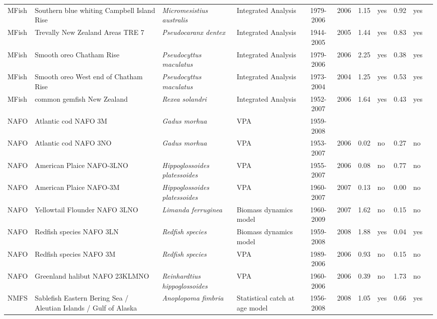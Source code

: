 \begin{longtable}{p{1.8cm}p{3.5cm}p{3.5cm}p{3cm}cccp{0.9cm}cp{0.9cm}c}
  MFish & Southern blue whiting Campbell Island Rise & \textit{Micromesistius australis} & Integrated Analysis & 1979-2006 & 2006 & 1.15 & yes & 0.92 & yes & \cite{NA} \\ 
  MFish & Trevally New Zealand Areas TRE 7 & \textit{Pseudocaranx dentex} & Integrated Analysis & 1944-2005 & 2005 & 1.44 & yes & 0.83 & yes & \cite{NA} \\ 
  MFish & Smooth oreo Chatham Rise & \textit{Pseudocyttus maculatus} & Integrated Analysis & 1979-2006 & 2006 & 2.25 & yes & 0.38 & yes & \cite{NA} \\ 
  MFish & Smooth oreo West end of Chatham Rise & \textit{Pseudocyttus maculatus} & Integrated Analysis & 1973-2004 & 2004 & 1.25 & yes & 0.53 & yes & \cite{NA} \\ 
  MFish & common gemfish New Zealand & \textit{Rexea solandri} & Integrated Analysis & 1952-2007 & 2006 & 1.64 & yes & 0.43 & yes & \cite{NA} \\ 
  NAFO & Atlantic cod NAFO 3M & \textit{Gadus morhua} & VPA & 1959-2008 &  &  &  &  &  & \cite{NAFO-3M-COD-2008.pdf} \\ 
  NAFO & Atlantic cod NAFO 3NO & \textit{Gadus morhua} & VPA & 1953-2007 & 2006 & 0.02 & no & 0.27 & no & \cite{NAFO-3NO-COD-2007.pdf} \\ 
  NAFO & American Plaice NAFO-3LNO & \textit{Hippoglossoides platessoides} & VPA & 1955-2007 & 2006 & 0.08 & no & 0.77 & no & \cite{NAFO-GrandBanks-AmPlaice-2007.pdf} \\ 
  NAFO & American Plaice NAFO-3M & \textit{Hippoglossoides platessoides} & VPA & 1960-2007 & 2007 & 0.13 & no & 0.00 & no & \cite{NAFO-AMPL3M-2008.pdf} \\ 
  NAFO & Yellowtail Flounder NAFO 3LNO & \textit{Limanda ferruginea} & Biomass dynamics model & 1960-2009 & 2007 & 1.62 & no & 0.15 & no & \cite{NAFO-YELL3LNO-2008.pdf} \\ 
  NAFO & Redfish species NAFO 3LN & \textit{Redfish species} & Biomass dynamics model & 1959-2008 & 2008 & 1.88 & yes & 0.04 & yes & \cite{NAFO-3LN-Redfishspp-2008.pdf} \\ 
  NAFO & Redfish species NAFO 3M & \textit{Redfish species} & VPA & 1989-2006 & 2006 & 0.93 & no & 0.15 & no & \cite{NAFO-RED3M-2007.pdf} \\ 
  NAFO & Greenland halibut NAFO 23KLMNO & \textit{Reinhardtius hippoglossoides} & VPA & 1960-2006 & 2006 & 0.39 & no & 1.73 & no & \cite{NAFO-GHAL23KLMNO-2007.pdf} \\ 
  NMFS & Sablefish Eastern Bering Sea / Aleutian Islands / Gulf of Alaska & \textit{Anoplopoma fimbria} & Statistical catch at age model & 1956-2008 & 2008 & 1.05 & yes & 0.66 & yes & \cite{AFSC-SABLEFEBSAIGA-2008-Sablefish EBS AI GA.pdf} \\ 

\end{longtable}
